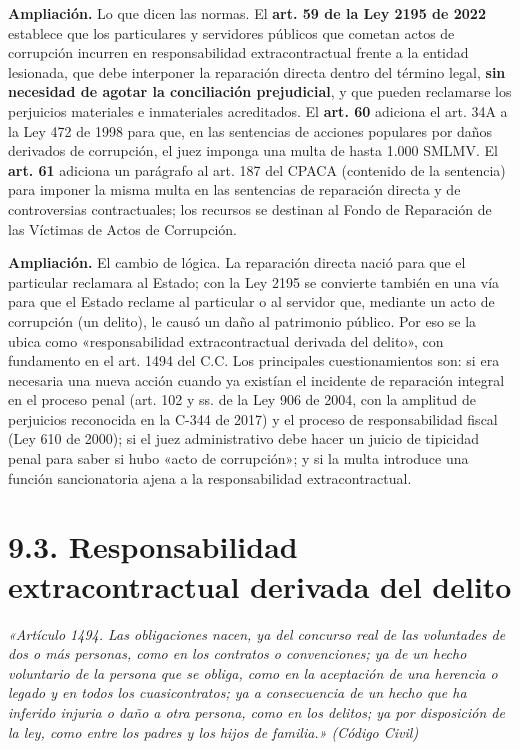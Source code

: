 \begin{ampliacion}
\textcolor[HTML]{5B3F8C}{\textbf{Ampliación. }}Lo que dicen las normas. El \textbf{art. 59 de la Ley 2195 de 2022} establece que los particulares y servidores públicos que cometan actos de corrupción incurren en responsabilidad extracontractual frente a la entidad lesionada, que debe interponer la reparación directa dentro del término legal, \textbf{sin necesidad de agotar la conciliación prejudicial}, y que pueden reclamarse los perjuicios materiales e inmateriales acreditados. El \textbf{art. 60} adiciona el art. 34A a la Ley 472 de 1998 para que, en las sentencias de acciones populares por daños derivados de corrupción, el juez imponga una multa de hasta 1.000 SMLMV. El \textbf{art. 61} adiciona un parágrafo al art. 187 del CPACA (contenido de la sentencia) para imponer la misma multa en las sentencias de reparación directa y de controversias contractuales; los recursos se destinan al Fondo de Reparación de las Víctimas de Actos de Corrupción.
\par
\textcolor[HTML]{5B3F8C}{\textbf{Ampliación. }}El cambio de lógica. La reparación directa nació para que el particular reclamara al Estado; con la Ley 2195 se convierte también en una vía para que el Estado reclame al particular o al servidor que, mediante un acto de corrupción (un delito), le causó un daño al patrimonio público. Por eso se la ubica como «responsabilidad extracontractual derivada del delito», con fundamento en el art. 1494 del C.C. Los principales cuestionamientos son: si era necesaria una nueva acción cuando ya existían el incidente de reparación integral en el proceso penal (art. 102 y ss. de la Ley 906 de 2004, con la amplitud de perjuicios reconocida en la C-344 de 2017) y el proceso de responsabilidad fiscal (Ley 610 de 2000); si el juez administrativo debe hacer un juicio de tipicidad penal para saber si hubo «acto de corrupción»; y si la multa introduce una función sancionatoria ajena a la responsabilidad extracontractual.
\end{ampliacion}
\section{9.3. Responsabilidad extracontractual derivada del delito}
\begin{cita}
\textit{«Artículo 1494. Las obligaciones nacen, ya del concurso real de las voluntades de dos o más personas, como en los contratos o convenciones; ya de un hecho voluntario de la persona que se obliga, como en la aceptación de una herencia o legado y en todos los cuasicontratos; ya a consecuencia de un hecho que ha inferido injuria o daño a otra persona, como en los delitos; ya por disposición de la ley, como entre los padres y los hijos de familia.» (Código Civil)}
\end{cita}
